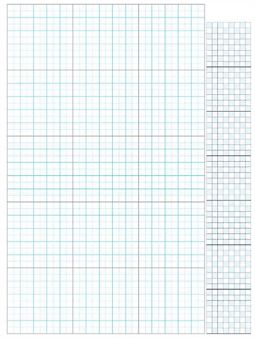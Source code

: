 \documentclass[titlepage, a4paper, 11pt]{article}
\begin{document}
		\endgroup
	\newpage
	\includegraphics{src/Miscellany/Grid_Paper.pdf}
	
		\begin{spacing}{0.6}
		\begin{small}
	
		\end{small}
	\end{spacing}
	
\end{document}
